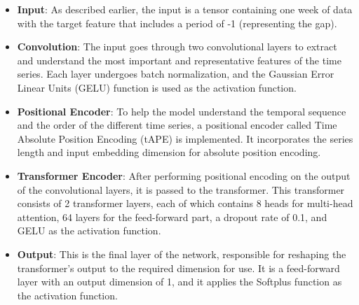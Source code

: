 \begin{itemize}
	\item \textbf{Input}: As described earlier,
	      the input is a tensor containing one week of data with the
	      target feature that includes a period of -1 (representing the gap).
	\item \textbf{Convolution}: The input goes through two convolutional layers to extract and understand the most important and representative features of the time series. Each layer undergoes batch normalization, and the Gaussian Error Linear Units (GELU)\cite{gelu} function is used as the activation function.
	\item \textbf{Positional Encoder}: To help the model understand the temporal sequence and the order of the different time series, a positional encoder called Time Absolute Position Encoding (tAPE)\cite{tape} is implemented. It incorporates the series length and input embedding dimension for absolute position encoding\cite{tape}.
	\item \textbf{Transformer Encoder}: After performing positional encoding on the output of the convolutional layers, it is passed to the transformer. This transformer\cite{attention} consists of 2 transformer layers, each of which contains 8 heads for multi-head attention\cite{attention}, 64 layers for the feed-forward part, a dropout rate of 0.1, and GELU as the activation function.
	\item \textbf{Output}: This is the final layer of the network, responsible for reshaping the transformer's output to the required dimension for use. It is a feed-forward layer with an output dimension of 1, and it applies the Softplus\cite{functions} function as the activation function.
\end{itemize}

